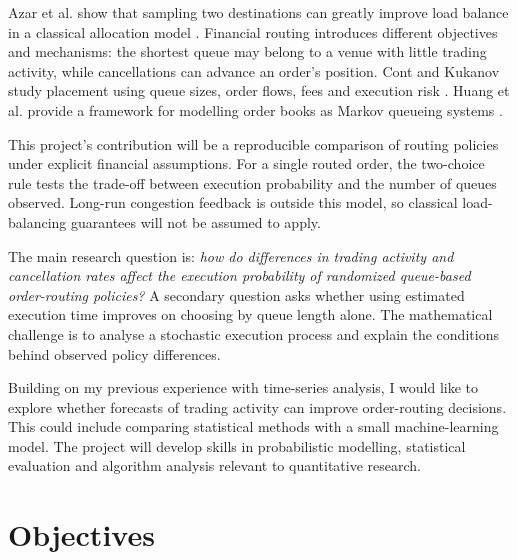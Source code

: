\documentclass[10pt,a4paper,oneside]{article}
\begin{document}
Azar et al. show that sampling two destinations can greatly improve load balance in a classical allocation model \cite{azar1999}. Financial routing introduces different objectives and mechanisms: the shortest queue may belong to a venue with little trading activity, while cancellations can advance an order's position. Cont and Kukanov study placement using queue sizes, order flows, fees and execution risk \cite{cont2017}. Huang et al. provide a framework for modelling order books as Markov queueing systems \cite{huang2015}.

This project's contribution will be a reproducible comparison of routing policies under explicit financial assumptions. For a single routed order, the two-choice rule tests the trade-off between execution probability and the number of queues observed. Long-run congestion feedback is outside this model, so classical load-balancing guarantees will not be assumed to apply.

The main research question is: \emph{how do differences in trading activity and cancellation rates affect the execution probability of randomized queue-based order-routing policies?} A secondary question asks whether using estimated execution time improves on choosing by queue length alone. The mathematical challenge is to analyse a stochastic execution process and explain the conditions behind observed policy differences.

Building on my previous experience with time-series analysis, I would like to explore whether forecasts of trading activity can improve order-routing decisions. This could include comparing statistical methods with a small machine-learning model. The project will develop skills in probabilistic modelling, statistical evaluation and algorithm analysis relevant to quantitative research.

\section{Objectives}
\end{document}
